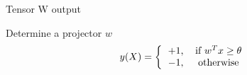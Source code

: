 \documentclass[handout]{beamer}
\begin{document}
\begin{frame}{Tensor W output}
{\begin{figure}[H]
        \caption{}
    \end{figure}
    }
\end{frame}

\begin{frame}{Determine a projector $w$}
    \Huge
    \begin{equation}
        y(X) = \left\{
                    \begin{tabular}{cc}
                        $+1$, & if $w^{T}x \geq \theta$ \\
                        $-1$, & otherwise
                    \end{tabular}
                \right.
    \end{equation}
\end{frame}

\end{document}
